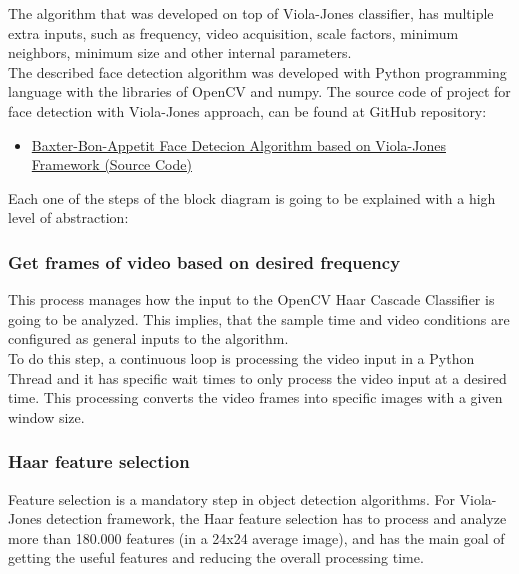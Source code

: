 \documentclass[11pt]{report} %
\begin{document}
The algorithm that was developed on top of Viola-Jones classifier, has multiple extra inputs, such as frequency, video acquisition, scale factors, minimum neighbors, minimum size and other internal parameters.\\

The described face detection algorithm was developed with Python programming language with the libraries of OpenCV and numpy. The source code of  project for face detection with Viola-Jones approach, can be found at  GitHub repository:


\begin{itemize}
    \color{blue}
    \item \href{https://github.com/san99tiago/baxter-bon-appetit/tree/main/python/computer_vision/face_detect_haar_cascade}{Baxter-Bon-Appetit Face Detecion Algorithm based on Viola-Jones Framework (Source Code)}
\end{itemize}


Each one of the steps of the block diagram is going to be explained with a high level of abstraction:

\subsubsection{Get frames of video based on desired frequency}

This process manages how the input to the OpenCV Haar Cascade Classifier is going to be analyzed. This implies, that the sample time and video conditions are configured as general inputs to the algorithm.\\

To do this step, a continuous loop is processing the video input in a Python Thread and it has specific wait times to only process the video input at a desired time. This processing converts the video frames into specific images with a given window size.\\

\subsubsection{Haar feature selection}

Feature selection is a mandatory step in object detection algorithms. For Viola-Jones detection framework, the Haar feature selection has to process and analyze more than 180.000 features (in a 24x24 average image), and has the main goal of getting the useful features and reducing the overall processing time.\\
\end{document}
